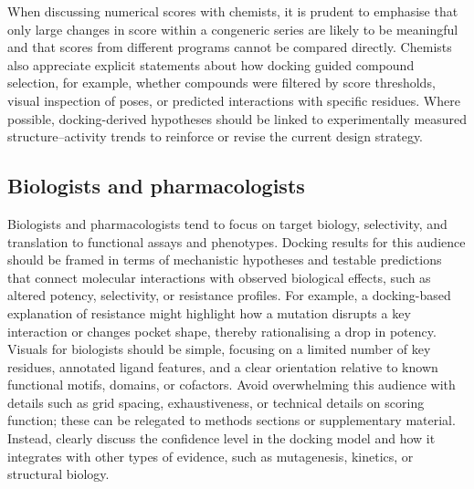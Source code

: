 \documentclass[12pt]{article}
\begin{document}
When discussing numerical scores with chemists, it is prudent to emphasise that only large changes in score within a congeneric series are likely to be meaningful and that scores from different programs cannot be compared directly\cite{CH11_BindingAffinity2018,CH11_EmpiricalScoring2018,CH11_Warren2006}.  Chemists also appreciate explicit statements about how docking guided compound selection, for example, whether compounds were filtered by score thresholds, visual inspection of poses, or predicted interactions with specific residues\cite{CH11_Forli2015,CH11_Cheng2012,CH11_zhu2022}.  Where possible, docking-derived hypotheses should be linked to experimentally measured structure--activity trends to reinforce or revise the current design strategy\cite{CH11_Cheng2012,CH11_cosconati2010,CH11_zhu2022}. 



\subsection{Biologists and pharmacologists}

Biologists and pharmacologists tend to focus on target biology, selectivity, and translation to functional assays and phenotypes\cite{CH11_zhu2022,CH11_Cheng2012,CH11_Forli2015}.  Docking results for this audience should be framed in terms of mechanistic hypotheses and testable predictions that connect molecular interactions with observed biological effects, such as altered potency, selectivity, or resistance profiles\cite{CH11_Kitchen2004,CH11_zhu2022,CH11_BindingAffinity2018}.  For example, a docking-based explanation of resistance might highlight how a mutation disrupts a key interaction or changes pocket shape, thereby rationalising a drop in potency\cite{CH11_Kitchen2004,CH11_Glide2004,CH11_Warren2006}.  Visuals for biologists should be simple, focusing on a limited number of key residues, annotated ligand features, and a clear orientation relative to known functional motifs, domains, or cofactors\cite{CH11_Berry2015,CH11_Forli2015,CH11_zhu2022}.  Avoid overwhelming this audience with details such as grid spacing, exhaustiveness, or technical details on scoring function; these can be relegated to methods sections or supplementary material\cite{CH11_Berry2015,CH11_Kitchen2004,CH11_cosconati2010}.  Instead, clearly discuss the confidence level in the docking model and how it integrates with other types of evidence, such as mutagenesis, kinetics, or structural biology\cite{CH11_Cheng2012,CH11_zhu2022,CH11_BindingAffinity2018}. 
\end{document}
